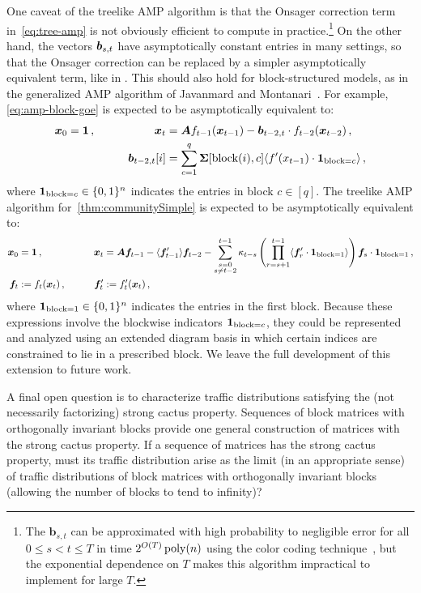 One caveat of the treelike AMP algorithm
is that the Onsager correction term
in~\cref{eq:tree-amp} is not obviously efficient
to compute in practice.\footnote{The $\bm b_{s,t}$ can be approximated with high probability to negligible error for all
$0\le s<t\le T$ in time $2^{O(T)}\operatorname{poly}(n)$ using the color coding
technique~\cite{colorCoding, heavyTailedWigner}, but the exponential
dependence on $T$ makes this
algorithm impractical to implement
for large $T$.}
On the other hand,
the vectors ${\bm b}_{s,t}$ have asymptotically constant entries in many settings,
so that the Onsager correction can be replaced by a simpler asymptotically equivalent term, like in .
This should also hold for block-structured models, as in the generalized AMP algorithm of Javanmard and Montanari~\cite{javanmard2013state}.
For example, \cref{eq:amp-block-goe} is expected to be asymptotically equivalent to:
\begin{alignat*}{2}
    {\bm x}_0 &= \bm{1}\,, \qquad &{\bm x}_t &= {\bm A} f_{t-1}(\bm x_{t-1}) - {\bm b}_{t-2,t} \cdot f_{t-2}(\bm x_{t-2})\,,\\
     && {\bm b}_{t-2,t}[i] &= \sum_{c = 1}^q \mathbf{\Sigma}[\operatorname{block}(i), c] \langle f'(x_{t-1}) \cdot \bm{1}_{\operatorname{block} = c} \rangle\,,
\end{alignat*}
where $\bm{1}_{\operatorname{block} = c} \in \{0,1\}^{n}$ indicates the entries in block $c \in [q]$.
The treelike AMP algorithm for~\cref{thm:communitySimple} is expected to be asymptotically equivalent to:
\begin{alignat*}{2}
    {\bm x}_0 &= \bm{1}\,, \qquad &{\bm x}_t &= {\bm A} {\bm f}_{t-1} - \langle {\bm f}'_{t-1} \rangle {\bm f}_{t-2}
    - \sum_{\substack{s = 0\\ s \neq t-2}}^{t-1} \kappa_{t-s} \left(\prod_{r=s+1}^{t-1} \langle {\bm f}_r' \cdot \bm{1}_{\operatorname{block} = 1} \rangle \right) {\bm f}_s \cdot \bm{1}_{\operatorname{block} = 1}\,, \\
    {\bm f}_{t} &:= f_t({\bm x}_t)\,, \qquad &{\bm f}'_t &:= f'_t({\bm x}_t)\,,
\end{alignat*}
where $\bm{1}_{\operatorname{block} = 1} \in \{0,1\}^n$ indicates the entries in the first block.
Because these expressions involve the blockwise indicators
$\bm{1}_{\operatorname{block} = c}$, they could be represented and analyzed using an extended
diagram basis in which certain indices are constrained to lie in a prescribed
block. We leave the full development of this extension to future work.

A final open question is to characterize traffic distributions satisfying the
(not necessarily factorizing) strong cactus property. Sequences of block matrices with orthogonally invariant
blocks provide one general construction of matrices with the strong cactus
property. If a sequence of matrices has the strong cactus property, must its
traffic distribution arise as the limit (in an appropriate sense) of traffic
distributions of block matrices with orthogonally invariant blocks (allowing the number of blocks to tend to infinity)?